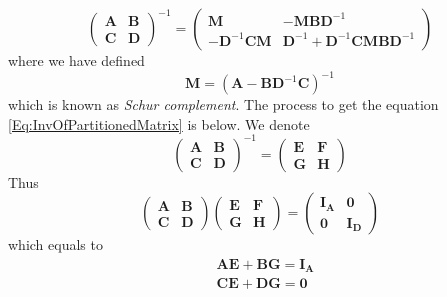 \documentclass[12pt, a4paper]{article}
\begin{document}
\begin{itemize}
\begin{equation}
            \begin{pmatrix}
                \bm{A} & \bm{B}\\
                \bm{C} & \bm{D}
            \end{pmatrix}^{-1}=\begin{pmatrix}
                \bm{M} & -\bm{MBD}^{-1}\\
                -\bm{D}^{-1}\bm{CM} & \bm{D}^{-1}+\bm{D}^{-1}\bm{CMBD}^{-1}
            \end{pmatrix}
        \end{equation}
        where we have defined
        \begin{equation}
            \label{Eq:SchurComplement}
            \bm{M}=(\bm{A}-\bm{BD}^{-1}\bm{C})^{-1}
        \end{equation}
        which is known as \textit{Schur complement}. The process to get the equation 
        \ref{Eq:InvOfPartitionedMatrix} is below. We denote
        \begin{equation*}
            \begin{pmatrix}
                \bm{A} & \bm{B}\\
                \bm{C} & \bm{D}
            \end{pmatrix}^{-1}=\begin{pmatrix}
                \bm{E} & \bm{F}\\
                \bm{G} & \bm{H}
            \end{pmatrix}
        \end{equation*}
        Thus
        \begin{equation*}
            \begin{pmatrix}
                \bm{A} & \bm{B}\\
                \bm{C} & \bm{D}
            \end{pmatrix}\begin{pmatrix}
                \bm{E} & \bm{F}\\
                \bm{G} & \bm{H}
            \end{pmatrix}=\begin{pmatrix}
                \bm{I_A} & \bm{0}\\
                \bm{0} & \bm{I_D}
            \end{pmatrix}
        \end{equation*}
        which equals to
        \begin{align*}
            &\bm{AE}+\bm{BG}=\bm{I_A}\\
            &\bm{CE}+\bm{DG}=\bm{0}\\

\end{align*}
\end{itemize}
\end{document}
